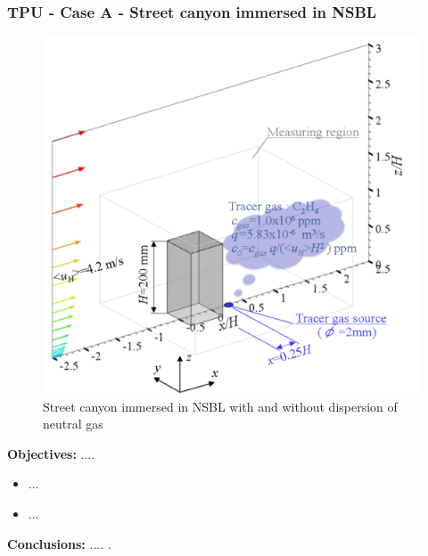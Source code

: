 \subsubsection{TPU - Case A - Street canyon immersed in NSBL}
    \begin{figure}[h!]
        \hypertarget{link:tpu_A}{}
        \centering
        \includegraphics[scale=0.6]{imgs/tpu_dataset_image.png}
        \caption{Street canyon immersed in NSBL with and without dispersion
        of neutral gas}
    \end{figure}
    \textbf{Objectives:} ....\newline
    \begin{itemize}
        \item ...
        \item ...
    \end{itemize}
    \textbf{Conclusions:} .... .\newline
